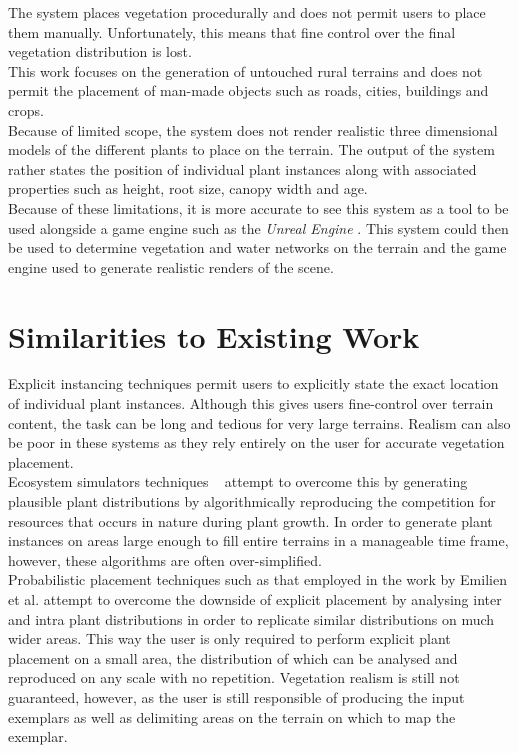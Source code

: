 The system places vegetation procedurally and does not permit users to place them manually. Unfortunately, this means that fine control over the final vegetation distribution is lost.\\

This work focuses on the generation of untouched rural terrains and does not permit the placement of man-made objects such as roads, cities, buildings and crops. \\

Because of limited scope, the system does not render realistic three dimensional models of the different plants to place on the terrain. The output of the system rather states the position of individual plant instances along with associated properties such as height, root size, canopy width and age.\\

Because of these limitations, it is more accurate to see this system as a tool to be used alongside a game engine such as the \textit{Unreal Engine} \protect\footnotemark {}. This system could then be used to determine vegetation and water networks on the terrain and the game engine used to generate realistic renders of the scene.

\section{Similarities to Existing Work}

Explicit instancing techniques \cite{Emilien,Deussen1998,Andujar2014} permit users to explicitly state the exact location of individual plant instances. Although this gives users fine-control over terrain content, the task can be long and tedious for very large terrains. Realism can also be poor in these systems as they rely entirely on the user for accurate vegetation placement.\\
Ecosystem simulators techniques ~\cite{Lane2002,Deussen1998} attempt to overcome this by generating plausible plant distributions by algorithmically reproducing the competition for resources that occurs in nature during plant growth. In order to generate plant instances on areas large enough to fill entire terrains in a manageable time frame, however, these algorithms are often over-simplified.\\
Probabilistic placement techniques such as that employed in the work by Emilien et al. \cite{Emilien} attempt to overcome the downside of explicit placement by analysing inter and intra plant distributions in order to replicate similar distributions on much wider areas. This way the user is only required to perform explicit plant placement on a small area, the distribution of which can be analysed and reproduced on any scale with no repetition. Vegetation realism is still not guaranteed, however, as the user is still responsible of producing the input exemplars as well as delimiting areas on the terrain on which to map the exemplar.\\


